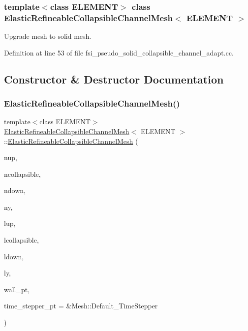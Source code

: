 \subsubsection*{template$<$class E\+L\+E\+M\+E\+NT$>$\newline
class Elastic\+Refineable\+Collapsible\+Channel\+Mesh$<$ E\+L\+E\+M\+E\+N\+T $>$}

Upgrade mesh to solid mesh. 

Definition at line 53 of file fsi\+\_\+pseudo\+\_\+solid\+\_\+collapsible\+\_\+channel\+\_\+adapt.\+cc.



\subsection{Constructor \& Destructor Documentation}
\mbox{\label{classElasticRefineableCollapsibleChannelMesh_a38336374b6cc91fa4a1c124515d9c2be}} 
\subsubsection{\texorpdfstring{Elastic\+Refineable\+Collapsible\+Channel\+Mesh()}{ElasticRefineableCollapsibleChannelMesh()}}
{\footnotesize\ttfamily template$<$class E\+L\+E\+M\+E\+NT$>$ \\
\hyperlink{classElasticRefineableCollapsibleChannelMesh}{Elastic\+Refineable\+Collapsible\+Channel\+Mesh}$<$ E\+L\+E\+M\+E\+NT $>$\+::\hyperlink{classElasticRefineableCollapsibleChannelMesh}{Elastic\+Refineable\+Collapsible\+Channel\+Mesh} (\begin{DoxyParamCaption}\item[{const unsigned \&}]{nup,  }\item[{const unsigned \&}]{ncollapsible,  }\item[{const unsigned \&}]{ndown,  }\item[{const unsigned \&}]{ny,  }\item[{const double \&}]{lup,  }\item[{const double \&}]{lcollapsible,  }\item[{const double \&}]{ldown,  }\item[{const double \&}]{ly,  }\item[{Geom\+Object $\ast$}]{wall\+\_\+pt,  }\item[{Time\+Stepper $\ast$}]{time\+\_\+stepper\+\_\+pt = {\ttfamily \&Mesh\+:\+:Default\+\_\+TimeStepper} }\end{DoxyParamCaption})\hspace{0.3cm}{\ttfamily [inline]}}



